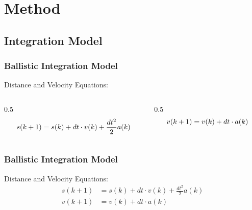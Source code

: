 
\section{Method}

\subsection{Integration Model}


\begin{frame}
  \frametitle{Ballistic Integration Model }

    Distance and Velocity Equations:
    \begin{columns}[c]
        \begin{column}{0.5\hsize}\centering
        $$ \small s(k+1) = s(k) + dt \cdot v(k) + \frac{dt^2}{2} a(k) $$    
        \end{column}

        \begin{column}{0.5\hsize}
        $$ \small v(k+1) = v(k) + dt \cdot a(k) $$
        \end{column}
    \end{columns}
 
    \hfil

    \hfil

    \hfil

\end{frame}


\begin{frame}
  \frametitle{Ballistic Integration Model }

    Distance and Velocity Equations:
    \begin{align}
    s(k+1) &= s(k) + dt \cdot v(k) + \frac{dt^2}{2} a(k) \\
    v(k+1) &= v(k) + dt \cdot a(k)
    \end{align}

    \hfil
{}

\end{frame}




